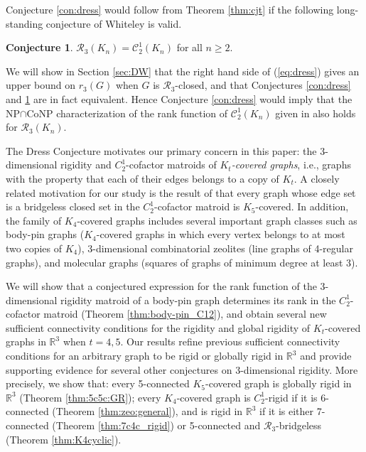 \documentclass[11pt,a4paper]{article}
\theoremstyle{definition}
\newtheorem{conjecture}[theorem]{Conjecture}
\newcommand{\cR}{\mathcal{R}}
\newcommand{\R}{\mathbb{R}}
\newcommand{\cC}{\mathcal{C}}
\begin{document}
Conjecture \ref{con:dress} would follow from Theorem \ref{thm:cjt} if the following long-standing conjecture of  Whiteley \cite{Wlong} is valid.

\begin{conjecture}\label{con:walter}
$\cR_3(K_n)=\cC_2^1(K_n)$ for all $n\geq 2$.
\end{conjecture}

We will show in Section \ref{sec:DW} that
the right hand side of (\ref{eq:dress}) 
gives an upper bound 
on  
$r_3(G)$ when $G$ is $\cR_3$-closed, and that
Conjectures \ref{con:dress} and \ref{con:walter} are in fact equivalent. Hence Conjecture \ref{con:dress} would imply that the NP$\cap$CoNP characterization of the rank function of $\cC_2^1(K_n)$ given in \cite{CJT} also holds for $\cR_3(K_n)$.

The Dress Conjecture motivates our primary concern in this paper: the 3-dimensional rigidity and $C_2^1$-cofactor matroids of  {\em $K_t$-covered graphs}, i.e., graphs with the property that each of their edges  belongs to a copy of $K_t$. A closely related motivation for our study is the result of \cite{CJT} that every 
graph whose edge set is a bridgeless closed set in the $C_2^1$-cofactor matroid is
$K_5$-covered. In addition, the family of $K_4$-covered graphs  
includes several important graph classes such as 
body-pin graphs ($K_4$-covered graphs in which every vertex belongs to at most two copies of $K_4$), 
3-dimensional combinatorial zeolites (line graphs of 4-regular graphs), and molecular graphs (squares of graphs of minimum degree at least $3$).


We will show that a conjectured expression for the rank function of the 3-dimensional rigidity matroid of a body-pin graph determines its rank in the $C_2^1$-cofactor matroid (Theorem \ref{thm:body-pin_C12}), and obtain several new sufficient connectivity conditions for the rigidity and global rigidity of
$K_t$-covered graphs in $\R^3$ when $t=4,5$.
Our results refine  previous  sufficient connectivity conditions \cite{LY,JJconnrig}
for an arbitrary graph to be rigid or globally rigid in $\R^3$ and
provide supporting evidence for several other conjectures on 3-dimensional rigidity. More precisely, we show that: every 5-connected $K_5$-covered graph is globally rigid in $\R^3$ (Theorem \ref{thm:5c5c:GR}); every  $K_4$-covered graph is $C^1_2$-rigid if it is 6-connected (Theorem \ref{thm:zeo:general}), and is rigid in  $\R^3$ if it is either  7-connected (Theorem \ref{thm:7c4c_rigid}) or  5-connected and $\cR_3$-bridgeless (Theorem \ref{thm:K4cyclic}).
\end{document}
